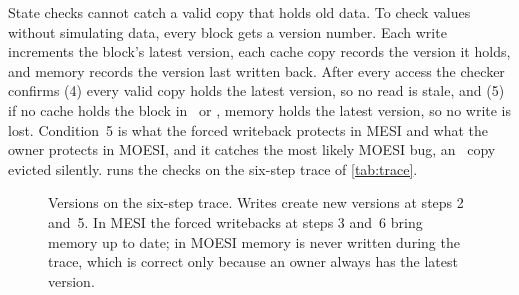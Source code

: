 State checks cannot catch a valid copy that holds old data. To check values
without simulating data, every block gets a version number. Each write increments
the block's latest version, each cache copy records the version it holds, and
memory records the version last written back. After every access the checker
confirms (4) every valid copy holds the latest version, so no read is stale, and
(5) if no cache holds the block in \stM\ or \stO, memory holds the latest version,
so no write is lost. Condition~5 is what the forced writeback protects in MESI and
what the owner protects in MOESI, and it catches the most likely MOESI bug, an
\stO\ copy evicted silently.  runs the checks on the six-step
trace of \cref{tab:trace}.

\begin{figure}[htbp]
\centering
\begin{bigfig}[0.95]
\end{bigfig}
\caption[Version-number check]{Versions on the six-step trace. Writes create new
versions at steps 2 and~5. In MESI the forced writebacks at steps 3 and~6 bring
memory up to date; in MOESI memory is never written during the trace, which is
correct only because an owner always has the latest version.}
\label{fig:versions}
\end{figure}

